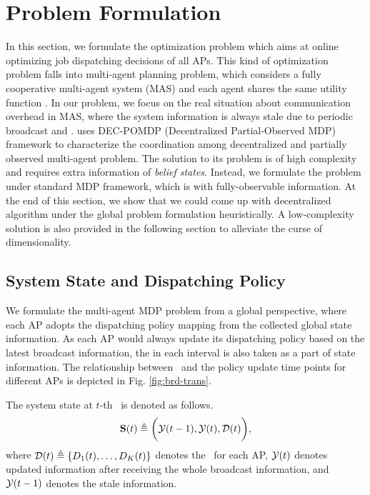 \section{Problem Formulation}
In this section, we formulate the optimization problem which aims at online optimizing job dispatching decisions of all APs.
This kind of optimization problem falls into multi-agent planning problem, which considers a fully cooperative multi-agent system (MAS) and each agent shares the same utility function .
In our problem, we focus on the real situation about communication overhead in MAS, where the system information is always stale due to periodic broadcast and \brdelay.
 uses DEC-POMDP (Decentralized Partial-Observed MDP) framework to characterize the coordination among decentralized and partially observed multi-agent problem. The solution to its problem is of high complexity and requires extra information of \emph{belief states}.
Instead, we formulate the problem under standard MDP framework, which is with fully-observable information.
At the end of this section, we show that we could come up with decentralized algorithm under the global problem formulation heuristically. A low-complexity solution is also provided in the following section to alleviate the curse of dimensionality.

\subsection{System State and Dispatching Policy}
We formulate the multi-agent MDP problem from a global perspective, where each AP adopts the dispatching policy mapping from the collected global state information.
As each AP would always update its dispatching policy based on the latest broadcast information, the  in each interval is also taken as a part of state information.
The relationship between \brdelay~and the policy update time points for different APs is depicted in Fig. \ref{fig:brd-trans}.

\begin{definition}
    The system state at $t$-th \brpoint~is denoted as follows.
    \begin{align}
        \mathbf{S}({t}) \triangleq \bigg(
            \mathcal{Y}({t-1}), \mathcal{Y}({t}), \mathcal{D}({t})
        \bigg),
    \end{align}
    where $\mathcal{D}({t}) \triangleq \{D_{1}({t}), \dots, D_{K}({t})\}$ denotes the \brdelay~for each AP, $\mathcal{Y}({t})$ denotes updated information after receiving the whole broadcast information, and $\mathcal{Y}({t-1})$ denotes the stale information.
\end{definition}

